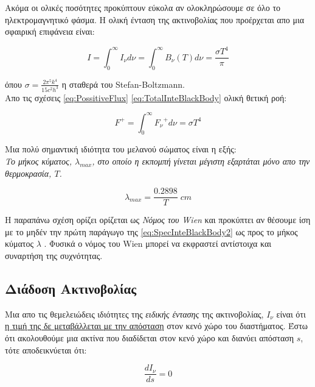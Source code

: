 Ακόμα οι ολικές ποσότητες προκύπτουν εύκολα αν ολοκληρώσουμε σε όλο το ηλεκτρομαγνητικό φάσμα. Η ολική ένταση της ακτινοβολίας που προέρχεται απο μια σφαιρική επιφάνεια είναι: 

\begin{equation}\label{eq:TotalInteBlackBody}
  Ι = \int_{0}^{\infty} I_{\nu} d\nu = \int_{0}^{\infty} B_{\nu}(T) d\nu = \frac{\sigma T^4}{\pi} 
\end{equation}

όπου $\sigma = \frac{2{\pi}^5k^4}{15c^2h^3}$ η σταθερά του {\en Stefan-Boltzmann}.\\ 

Απο τις σχέσεις \eqref{eq:PossitiveFlux} \eqref{eq:TotalInteBlackBody} ολική θετική ροή:

\begin{equation}\label{eq:TotalPossitiveFlux}
  F^{+} = \int_{0}^{\infty} {F_{\nu}}^{+} d\nu = \sigma T^4
\end{equation}

Μια πολύ σημαντική ιδιότητα του μελανού σώματος είναι η εξής:\\
{\it Το μήκος κύματος, $\lambda_{max}$, στο οποίο η εκπομπή γίνεται μέγιστη εξαρτάται μόνο απο την θερμοκρασία, $T$.}

\begin{equation}\label{eq:WienLaw}
  \lambda_{max} = \frac{0.2898}{T} \; cm
\end{equation}

Η παραπάνω σχέση ορίζει ορίζεται ως {\it Νόμος του {\en Wien}} και προκύπτει αν θέσουμε ίση με το μηδέν την πρώτη παράγωγο της \eqref{eq:SpecInteBlackBody2} ως προς το μήκος κύματος $\lambda$ . Φυσικά ο νόμος του {\en Wien} μπορεί να εκφραστεί αντίστοιχα και συναρτήση της συχνότητας.

\subsection{Διάδοση Ακτινοβολίας}

Μια απο τις θεμελειώδεις ιδιότητες της {\it ειδικής έντασης} της ακτινοβολίας, $I_{\nu}$ είναι ότι \underline{η τιμή της δε μεταβάλλεται με την απόσταση} στον κενό χώρο του διαστήματος. Έστω ότι ακολουθούμε μια ακτίνα που διαδίδεται στον κενό χώρο και διανύει απόσταση $s$, τότε αποδεικνύεται ότι:

\begin{equation}\label{eq:ConstantSpecInte}
  \frac{dI_{\nu}}{ds}=0 
\end{equation}

